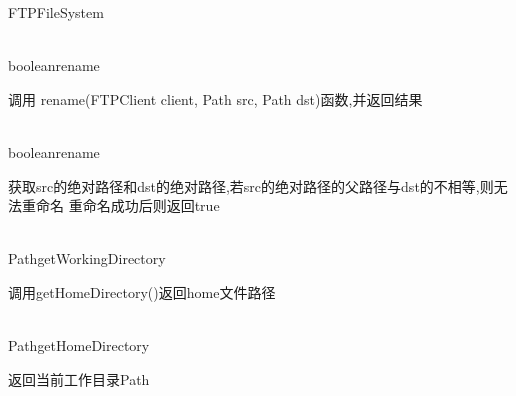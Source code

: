 \begin{XeClass}{FTPFileSystem}
  \begin{XeMethod}{\XePublic\\ }{boolean}{rename}
       
 调用 rename(FTPClient client, Path src, Path dst)函数,并返回结果

  \end{XeMethod}

  \begin{XeMethod}{\XePrivate\\ }{boolean}{rename}
       
 获取src的绝对路径和dst的绝对路径,若src的绝对路径的父路径与dst的不相等,则无法重命名
 重命名成功后则返回true

  \end{XeMethod}

  \begin{XeMethod}{\XePublic\\ }{Path}{getWorkingDirectory}
       
 调用getHomeDirectory()返回home文件路径

  \end{XeMethod}

  \begin{XeMethod}{\XePublic\\ }{Path}{getHomeDirectory}
       
 返回当前工作目录Path

  \end{XeMethod}

\end{XeClass}
